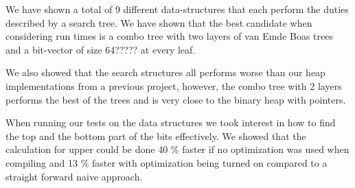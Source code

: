\documentclass[oneside,11pt,openright]{report}
\begin{document}
We have shown a total of 9 different data-structures that each perform the duties described by a search tree. We have shown that the best candidate when considering run times is a combo tree with two layers of van Emde Boas trees and a bit-vector of size 64????? at every leaf.

We also showed that the search structures all performs worse than our heap implementations from a previous project, however, the combo tree with 2 layers performs the best of the trees and is very close to the binary heap with pointers.

When running our tests on the data structures we took interest in how to find the top and the bottom part of the bits effectively. We showed that the calculation for upper could be done 40 \% faster if no optimization was used when compiling and 13 \% faster with optimization being turned on compared to a straight forward naive approach. 



 

\end{document}
